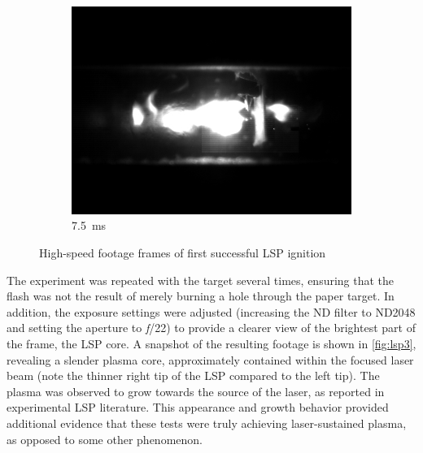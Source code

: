 \begin{figure}[h]
            \hfill
            \begin{subfigure}[t]{0.32\textwidth}
                \centering
                \includegraphics[width=\textwidth]{assets/3 design/LSP1_frames/75.jpg}
                \caption{7.5~ms}
                \label{fig:lsp1_75}
            \end{subfigure}
            \caption{High-speed footage frames of first successful LSP ignition}
            \label{fig:lsp1}
        \end{figure}

        The experiment was repeated with the target several times, ensuring that the flash was not the result of merely burning a hole through the paper target. In addition, the exposure settings were adjusted (increasing the ND filter to ND2048 and setting the aperture to \textit{f}/22) to provide a clearer view of the brightest part of the frame, the LSP core. A snapshot of the resulting footage is shown in \autoref{fig:lsp3}, revealing a slender plasma core, approximately contained within the focused laser beam (note the thinner right tip of the LSP compared to the left tip). The plasma was observed to grow towards the source of the laser, as reported in experimental LSP literature. This appearance and growth behavior provided additional evidence that these tests were truly achieving laser-sustained plasma, as opposed to some other phenomenon.

